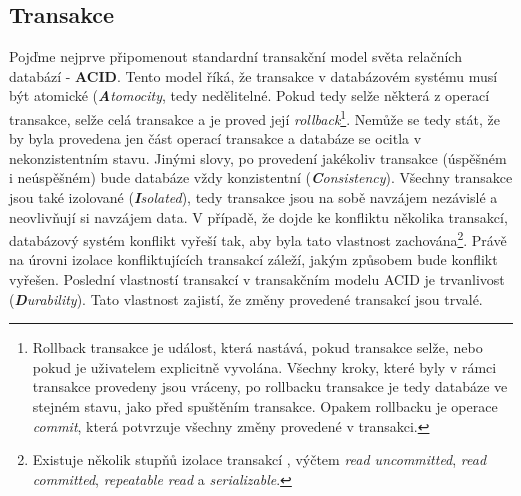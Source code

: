 
\subsection{Transakce}
Pojďme nejprve připomenout standardní transakční model světa relačních databází - \textbf{ACID}. Tento model říká, že transakce v databázovém systému musí být atomické (\textit{\textbf{A}tomocity}, tedy nedělitelné. Pokud tedy selže některá z operací transakce, selže celá transakce a je proved její \textit{rollback}\footnote{Rollback transakce je událost, která nastává, pokud transakce selže, nebo pokud je uživatelem explicitně vyvolána. Všechny kroky, které byly v rámci transakce provedeny jsou vráceny, po rollbacku transakce je tedy databáze ve stejném stavu, jako před spuštěním transakce. Opakem rollbacku je operace \textit{commit}, která potvrzuje všechny změny provedené v transakci.}. Nemůže se tedy stát, že by byla provedena jen část operací transakce a databáze se ocitla v nekonzistentním stavu. Jinými slovy, po provedení jakékoliv transakce (úspěšném i neúspěšném) bude databáze vždy konzistentní (\textit{\textbf{C}onsistency}). Všechny transakce jsou také izolované (\textit{\textbf{I}solated}), tedy transakce jsou na sobě navzájem nezávislé a neovlivňují si navzájem data. V případě, že dojde ke konfliktu několika transakcí, databázový systém konflikt vyřeší tak, aby byla tato vlastnost zachována\footnote{Existuje několik stupňů izolace transakcí , výčtem \textit{read uncommitted}, \textit{read committed}, \textit{repeatable read} a \textit{serializable}.}. Právě na úrovni izolace konfliktujících transakcí záleží, jakým způsobem bude konflikt vyřešen. Poslední vlastností transakcí v transakčním modelu ACID je trvanlivost (\textit{\textbf{D}urability}). Tato vlastnost zajistí, že změny provedené transakcí jsou trvalé. 

